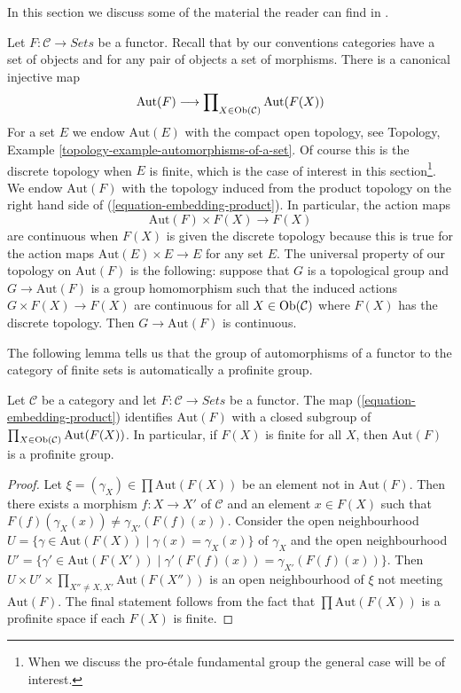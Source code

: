 \noindent
In this section we discuss some of the material the reader can
find in \cite[Expos\'e V, Sections 4, 5, and 6]{SGA1}.

\medskip\noindent
Let $F : \mathcal{C} \to \textit{Sets}$ be a functor.
Recall that by our conventions categories have a set of objects and
for any pair of objects a set of morphisms. There is a canonical
injective map
\begin{equation}
\label{equation-embedding-product}
\text{Aut}(F)
\longrightarrow
\prod\nolimits_{X \in \mathop{\mathrm{Ob}}\nolimits(\mathcal{C})} \text{Aut}(F(X))
\end{equation}
For a set $E$ we endow $\text{Aut}(E)$ with the compact open topology, see
Topology, Example \ref{topology-example-automorphisms-of-a-set}.
Of course this is the discrete topology when $E$ is finite, which
is the case of interest in this section\footnote{When we discuss the
pro-\'etale fundamental group the general case will be of interest.}.
We endow $\text{Aut}(F)$ with the topology induced from the
product topology on the right hand side of (\ref{equation-embedding-product}).
In particular, the action maps
$$
\text{Aut}(F) \times F(X) \longrightarrow F(X)
$$
are continuous when $F(X)$ is given the discrete topology because this
is true for the action maps $\text{Aut}(E) \times E \to E$ for any set $E$.
The universal property of our topology on $\text{Aut}(F)$ is the following:
suppose that $G$ is a topological group and $G \to \text{Aut}(F)$
is a group homomorphism such that the induced actions $G \times F(X) \to F(X)$
are continuous for all $X \in \mathop{\mathrm{Ob}}\nolimits(\mathcal{C})$ where $F(X)$ has
the discrete topology. Then $G \to \text{Aut}(F)$ is continuous.

\medskip\noindent
The following lemma tells us that the group of automorphisms of a functor
to the category of finite sets is automatically a profinite group.

\begin{lemma}
\label{lemma-aut-inverse-limit}
Let $\mathcal{C}$ be a category and let $F : \mathcal{C} \to \textit{Sets}$
be a functor. The map (\ref{equation-embedding-product}) identifies
$\text{Aut}(F)$ with a closed subgroup of
$\prod_{X \in \mathop{\mathrm{Ob}}\nolimits(\mathcal{C})} \text{Aut}(F(X))$.
In particular, if $F(X)$ is finite for all $X$, then
$\text{Aut}(F)$ is a profinite group.
\end{lemma}

\begin{proof}
Let $\xi = (\gamma_X) \in \prod \text{Aut}(F(X))$ be an element not in
$\text{Aut}(F)$. Then there exists a morphism $f : X \to X'$ of $\mathcal{C}$
and an element $x \in F(X)$ such that
$F(f)(\gamma_X(x)) \not = \gamma_{X'}(F(f)(x))$.
Consider the open neighbourhood
$U = \{\gamma \in \text{Aut}(F(X)) \mid \gamma(x) = \gamma_X(x)\}$
of $\gamma_X$ and the open neighbourhood
$U' = \{\gamma' \in \text{Aut}(F(X')) \mid \gamma'(F(f)(x)) =
\gamma_{X'}(F(f)(x))\}$.
Then
$U \times U' \times \prod_{X'' \not = X, X'} \text{Aut}(F(X''))$
is an open neighbourhood of $\xi$ not meeting $\text{Aut}(F)$.
The final statement follows from the fact that
$\prod \text{Aut}(F(X))$ is a profinite space if each $F(X)$ is finite.
\end{proof}

